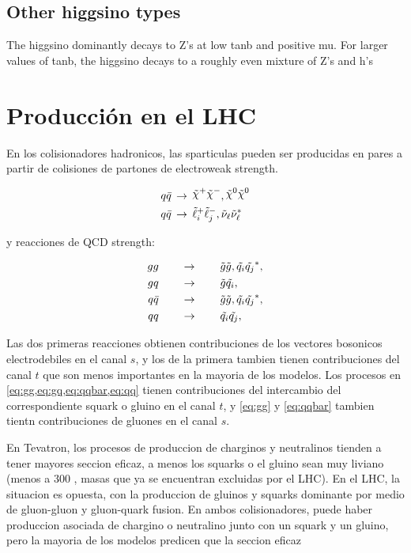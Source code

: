 \subsection{Other higgsino types}

The higgsino dominantly decays to Z's at low tanb and positive mu. For larger values of tanb, the higgsino decays to a roughly even mixture of Z's and h's


\section{Producción en el LHC}


En los colisionadores hadronicos, las sparticulas pueden ser producidas en pares a partir
de colisiones de partones de electroweak strength.

\begin{align}
  &q\bar{q} \, \to \, \chinop \chinom, \nino \nino \\
  &q\bar{q} \, \to \, \susy{\ell}^{+}_{i}\susy{\ell}^{-}_{j}, \susy{\nu}_{\ell}\susy{\nu}^{*}_{\ell}
\end{align}

y reacciones de QCD strength:

\begin{align}
  gg \qquad &\rightarrow \qquad \tilde{g}\tilde{g}, \tilde{q_i}\tilde{q_j}^{*}, \label{eq:gg}\\
  gq \qquad &\rightarrow \qquad \tilde{g}\tilde{q_i}, \label{eq:gq} \\
  q\bar{q} \qquad &\rightarrow \qquad \tilde{g}\tilde{g}, \tilde{q_i}\tilde{q_j}^{*}, \label{eq:qqbar} \\
  qq \qquad &\rightarrow \qquad \tilde{q_i}\tilde{q_j}, \label{eq:qq} \\
\end{align}

Las dos primeras reacciones obtienen contribuciones de los vectores bosonicos
electrodebiles en el canal $s$, y los de la primera tambien tienen contribuciones
del canal $t$ que son menos importantes en la mayoria de los modelos.
Los procesos en \eqref{eq:gg,eq:gq,eq:qqbar,eq:qq} tienen contribuciones del intercambio
del correspondiente squark o gluino en el canal $t$, y \eqref{eq:gg} y \eqref{eq:qqbar}
tambien tientn contribuciones de gluones en el canal $s$.


En Tevatron, los procesos de produccion de charginos y neutralinos tienden a tener
mayores seccion eficaz, a menos los squarks o el gluino sean muy liviano (menos a 300 \gev,
masas que ya se encuentran excluidas por el LHC). En el LHC, la situacion es opuesta, con la
produccion de gluinos y squarks dominante por medio de gluon-gluon y gluon-quark fusion.
En ambos colisionadores, puede haber produccion asociada de chargino o neutralino junto con
un squark y un gluino, pero la mayoria de los modelos predicen que la seccion eficaz





